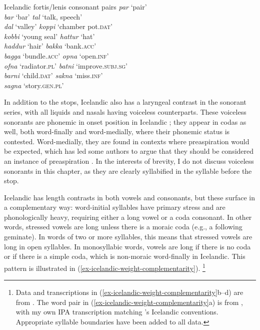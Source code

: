 \documentclass[output=paper,colorlinks,citecolor=brown]{langscibook}
\begin{document}
\ea Icelandic fortis\slash lenis consonant pairs \citep[99, 106, 221]{arnason2011}\label{ex-icelandic-fortis-lenis}
\ea{}	
	\ea 
	    \textit{par} \tab [pʰaːr̥] \tab `pair' \\
	    \textit{bar} \tab [paːr̥] \tab  `bar' 
	\ex
	    \textit{tal} \tab [tʰaːl̥] \tab `talk, speech' \\
	    \textit{dal} \tab [taːl̥] \tab  `valley' 
	\z
\ex	\ea \textit{koppi} \tab [kʰɔhpɪ] \tab `chamber pot.\textsc{dat}'\\
        \textit{kobbi} \tab [kʰɔpːɪ] \tab `young seal' 
	\ex \textit{hattur} \tab [hahtʏr̥]\tab `hat' \\
	    \textit{haddur} \tab [hatːʏr̥]\tab `hair' 
	\ex  \textit{bakka} \tab [pahka] \tab `bank.\textsc{acc}' \\
	     \textit{bagga} \tab [pakːa] \tab `bundle.\textsc{acc}' 
	\z
\ex	\ea \textit{opna} \tab [ɔhpna]   \tab `open.\textsc{inf}' \\
        \textit{ofna} \tab [ɔpna]    \tab `radiator.\textsc{pl}' 
	\ex \textit{batni} \tab [pahtnɪ] \tab `improve.\textsc{subj.sg}' \\
	    \textit{barni} \tab [patnɪ]  \tab `child.\textsc{dat}' 
	\ex \textit{sakna} \tab [sahkna] \tab `miss.\textsc{inf}' \\
	    \textit{sagna} \tab [sakna]  \tab `story.\textsc{gen.pl}' 
	\z
	\z
\z

In addition to the stops, Icelandic also has a laryngeal contrast in the sonorant series, with all liquids and nasals having voiceless counterparts. These voiceless sonorants are phonemic in onset position in Icelandic \citep{jessenpetursson1998}; they appear in codas as well, both word-finally and word-medially, where their phonemic status is contested. Word-medially, they are found in contexts where preaspiration would be expected, which has led some authors to argue that they should be considered an instance of preaspiration \citep[e.g.,][]{thrainsson1978,ringen1999}. In the interests of brevity, I do not discuss voiceless sonorants in this chapter, as they are clearly syllabified in the syllable before the stop.

Icelandic has length contrasts in both vowels and consonants, but these surface in a complementary way: word-initial syllables have primary stress and are phonologically heavy, requiring either a long vowel or a coda consonant. In other words, stressed vowels are long unless there is a moraic coda (e.g., a following geminate). In words of two or more syllables, this means that stressed vowels are long in open syllables. In monosyllabic words, vowels are long if there is no coda or if there is a simple coda, which is non-moraic word-finally in Icelandic.  This pattern is illustrated in (\ref{ex-icelandic-weight-complementarity}).%
\footnote{Data and transcriptions in (\ref{ex-icelandic-weight-complementarity}b--d) are from \citet{arnason2011}. The word pair in (\ref{ex-icelandic-weight-complementarity}a) is from \citet{garnes1976}, with my own IPA transcription matching \citeauthor{arnason2011}'s Icelandic conventions. Appropriate syllable boundaries have been added to all data.}
\end{document}
